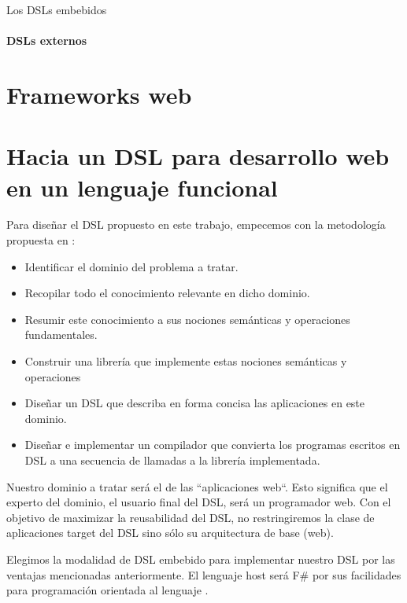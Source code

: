 \documentclass[12pt]{report}
\begin{document}
Los DSLs embebidos 

\subsubsection{DSLs externos}

\chapter{Frameworks web}

\chapter{Hacia un DSL para desarrollo web en un lenguaje funcional}

Para diseñar el DSL propuesto en este trabajo, empecemos con la metodología propuesta en \cite{van1998little}:

\begin{itemize}
	\item Identificar el dominio del problema a tratar.
	\item Recopilar todo el conocimiento relevante en dicho dominio.
	\item Resumir este conocimiento a sus nociones semánticas y operaciones fundamentales.
	\item Construir una librería que implemente estas nociones semánticas y operaciones
	\item Diseñar un DSL que describa en forma concisa las aplicaciones en este dominio.
	\item Diseñar e implementar un compilador que convierta los programas escritos en DSL a una secuencia de llamadas a la librería implementada.
\end{itemize}

Nuestro dominio a tratar será el de las ``aplicaciones web``. Esto significa que el experto del dominio, el usuario final del DSL, será un programador web. Con el objetivo de maximizar la reusabilidad del DSL, no restringiremos la clase de aplicaciones target del DSL sino sólo su arquitectura de base (web). 

Elegimos la modalidad de DSL embebido para implementar nuestro DSL por las ventajas mencionadas anteriormente. El lenguaje host será F\# por sus facilidades para programación orientada al lenguaje \cite{syme2007expert} \cite{pickering2007foundations} \cite{smith-lop} \cite{petricek-lop}.
\end{document}
